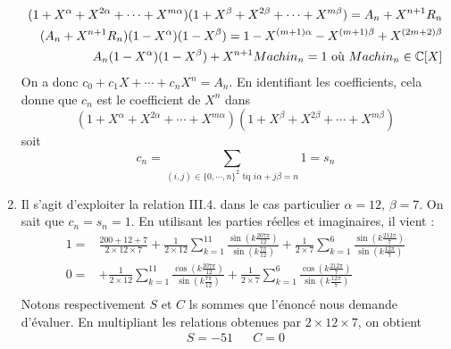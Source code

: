 \begin{enumerate}
\begin{displaymath}
\end{displaymath}
\begin{align*}
 (1+X^\alpha + X^{2\alpha}+\cdots+X^{m\alpha}) (1+X^\beta + X^{2\beta}+\cdots+X^{m\beta}) = A_n + X^{n+1}R_n \\
(A_n + X^{n+1}R_n)(1-X^\alpha)(1-X^\beta) = 1 - X^{(m+1)\alpha}- X^{(m+1)\beta}+ X^{(2m+2)\beta}\\
A_n (1-X^\alpha)(1-X^\beta) + X^{n+1}Machin_n = 1 \text{ où } Machin_n\in \mathbb{C}[X]
\end{align*}
On a donc $c_0+c_1X+\cdots+c_nX^n=A_n$. En identifiant les coefficients, cela donne que $c_n$ est le coefficient de $X^n$ dans
\begin{displaymath}
 (1+X^\alpha + X^{2\alpha}+\cdots+X^{m\alpha})(1+X^\beta + X^{2\beta}+\cdots+X^{m\beta})
\end{displaymath}
soit
\begin{displaymath}
 c_n = \sum_{(i,j)\in\{0,\cdots,n\}^2 \text{ tq } i\alpha+j\beta=n}1 = s_n
\end{displaymath}

\item Il s'agit d'exploiter la relation III.4. dans le cas particulier $\alpha=12$, $\beta=7$. On sait que $c_n=s_n=1$. En utilisant les parties réelles et imaginaires, il vient :
\begin{align*}
 1 =&\frac{200 + 12 +7}{2\times 12 \times 7} 
+\frac{1}{2 \times 12}\sum_{k=1}^{11}\frac{\sin\left( k\frac{207\pi}{12}\right) }{\sin\left( k\frac{7\pi}{12}\right)}
+\frac{1}{2 \times 7}\sum_{k=1}^{6}\frac{\sin\left( k\frac{212\pi}{7}\right) }{\sin\left( k\frac{12\pi}{7}\right)} \\
0 =& 
+\frac{1}{2 \times 12}\sum_{k=1}^{11}\frac{\cos\left( k\frac{207\pi}{12}\right) }{\sin\left( k\frac{7\pi}{12}\right)}
+\frac{1}{2 \times 7}\sum_{k=1}^{6}\frac{\cos\left( k\frac{212\pi}{7}\right) }{\sin\left( k\frac{12\pi}{7}\right)} \\
\end{align*}
Notons respectivement $S$ et $C$ ls sommes que l'énoncé nous demande d'évaluer. En multipliant les relations obtenues par $2\times 12 \times 7$, on obtient
\begin{align*}
 S= -51 & & C= 0
\end{align*}
 
\end{enumerate}
